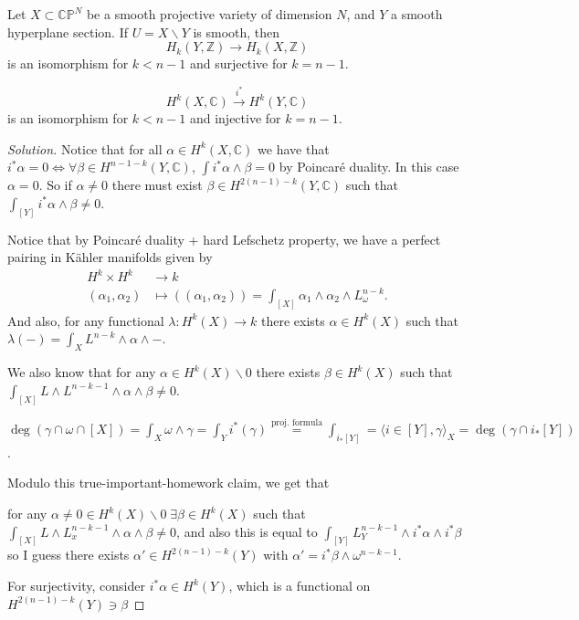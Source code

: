 \documentclass{article}
\newcommand{\Z}{\mathbb{Z}}
\newcommand{\C}{\mathbb{C}}
\begin{document}
\begin{exercise}
	Let $X\subset \C\mathbb{P}^N$ be a smooth projective variety of dimension $N$, and $Y$ a smooth hyperplane section. If $U=X\backslash Y$ is smooth, then
	\[H_k(Y,\Z)\to H_k(X,\Z)\]
	is an isomorphism for $k<n-1$ and surjective for $k=n-1$.
\end{exercise}
\begin{exercise}
	\[H^k(X,\C)\overset{i^*}{\to}H^k(Y,\C)\]
	is an isomorphism for $k<n-1$ and injective for  $k=n-1$.
\end{exercise}
\begin{proof}[Solution]
	Notice that for all $\alpha\in H^k(X,\C)$ we have that $i^*\alpha=0\iff\forall\beta\in H^{n-1-k}(Y,\C)$, $\int i^*\alpha\wedge\beta=0$ by Poincar\'e duality. In this case $\alpha=0$. So if  $\alpha\neq 0$ there must exist $\beta\in H^{2(n-1)-k}(Y,\C)$ such that $\int_{[Y]}i^*\alpha\wedge\beta\neq 0$.

	Notice that by Poincar\'e duality + hard Lefschetz property, we have a perfect pairing in K\"ahler manifolds given by
	\begin{align*}
		 H^k\times H^k &\longrightarrow k \\
		 (\alpha_1,\alpha_2) &\longmapsto ( (\alpha_1,\alpha_2)) = \int_{[X]}\alpha_1\wedge\alpha_2\wedge L^{n-k}_\omega
	.\end{align*}
	And also, for any functional $\lambda:H^k(X)\to k$ there exists $\alpha\in H^k(X)$ such that $\lambda(-)=\int_XL^{n-k}\wedge\alpha\wedge-$.

	We also know that for any $\alpha\in H^k(X)\backslash 0$ there exists $\beta\in H^k(X)$ such that $\int_{[X]}L\wedge L^{n-k-1}\wedge\alpha\wedge\beta\neq 0$.
	\begin{claim}
		$\deg(\gamma\cap\omega\cap[X])=\int_X\omega\wedge\gamma=\int_Yi^*(\gamma)\overset{\text{proj. formula}}{=}\int_{i_*[Y]}=\langle i\in[Y],\gamma\rangle_X=\deg(\gamma\cap i_*[Y])$.	
	\end{claim}

Modulo this true-important-homework claim, we get that

for any $\alpha\neq 0\in H^k(X)\backslash 0\;\exists \beta\in H^k(X)$ such that $\int_{[X]}L\wedge L_x^{n-k-1}\wedge\alpha\wedge\beta\neq 0$, and also this is equal to $\int_{[Y]}L_Y^{n-k-1}\wedge i^*\alpha\wedge i^*\beta$ so I guess there exists $\alpha'\in H^{2(n-1)-k}(Y)$ with $\alpha'=i^*\beta\wedge\omega^{n-k-1}$.

For surjectivity, consider $i^*\alpha\in H^k(Y)$, which is a functional on $H^{2(n-1)-k}(Y)\ni\beta$
\end{proof}




\end{document}
